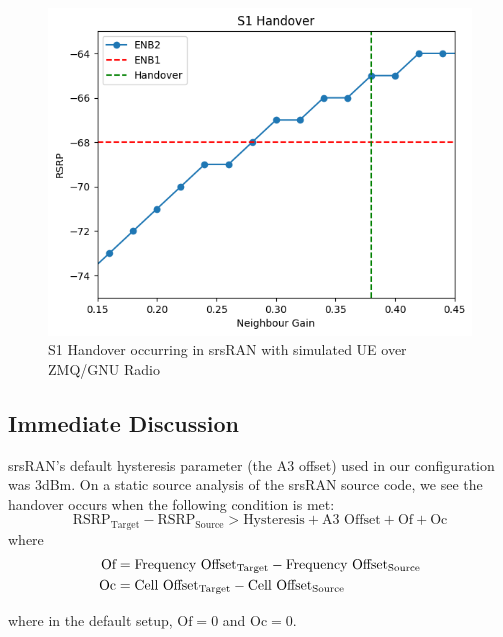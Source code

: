 \begin{figure}
    \centering
    \includegraphics[width=1\linewidth]{src/img/zmq_s1_handover.png}
    \caption{S1 Handover occurring in srsRAN with simulated UE over ZMQ/GNU Radio}
    \label{fig:methods:zmq-s1-handover}
\end{figure}
\subsection{Immediate Discussion}
 srsRAN's default hysteresis parameter (the A3 offset) used in our configuration was 3dBm.  On a static source analysis of the srsRAN source code, we see the handover occurs when the following condition is met:
 \begin{equation}\label{eq:hysteresis}
     \text{RSRP}_\text{Target} - \text{RSRP}_\text{Source} > \text{Hysteresis} + \text{A3 Offset} + \text{Of} + \text{Oc}
 \end{equation}
where 
\begin{equation}
\begin{split}
\text{Of} &= \text{Frequency Offset\textsubscript{Target}} - \text{Frequency Offset\textsubscript{Source}} \\
\text{Oc} &= \text{Cell Offset\textsubscript{Target}} - \text{Cell Offset\textsubscript{Source}}
\end{split}
\end{equation}

where in the default setup, $\text{Of}=0$ and $\text{Oc}=0$.

